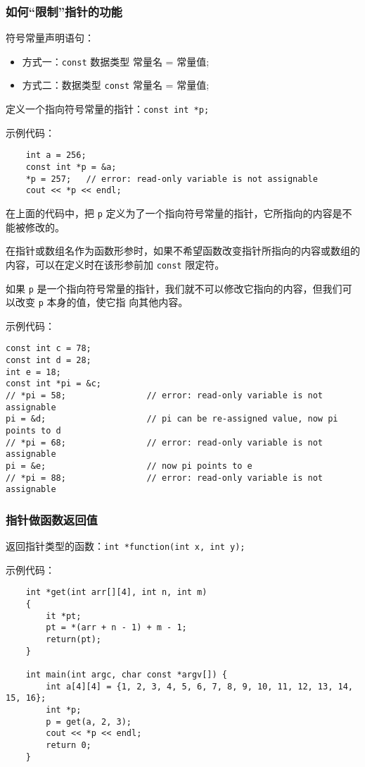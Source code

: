 \documentclass[UTF8]{ctexart}
\begin{document}
\subsubsection{如何“限制”指针的功能}
符号常量声明语句：
\begin{itemize}
    \item 方式一：\texttt{const} 数据类型 常量名 = 常量值;
    \item 方式二：数据类型 \texttt{const} 常量名 = 常量值;
\end{itemize}

定义一个指向符号常量的指针：\texttt{const int *p;}

示例代码：
\begin{verbatim}
    int a = 256;
    const int *p = &a;
    *p = 257;   // error: read-only variable is not assignable
    cout << *p << endl;
\end{verbatim}

在上面的代码中，把 \texttt{p} 定义为了一个指向符号常量的指针，它所指向的内容是不能被修改的。

在指针或数组名作为函数形参时，如果不希望函数改变指针所指向的内容或数组的内容，可以在定义时在该形参前加 \texttt{const}
限定符。

如果 \texttt{p} 是一个指向符号常量的指针，我们就不可以修改它指向的内容，但我们可以改变 \texttt{p} 本身的值，使它指
向其他内容。

示例代码：
\begin{verbatim}
const int c = 78;
const int d = 28;
int e = 18;
const int *pi = &c;
// *pi = 58;                // error: read-only variable is not assignable
pi = &d;                    // pi can be re-assigned value, now pi points to d
// *pi = 68;                // error: read-only variable is not assignable
pi = &e;                    // now pi points to e
// *pi = 88;                // error: read-only variable is not assignable
\end{verbatim}

\subsubsection{指针做函数返回值}
返回指针类型的函数：\texttt{int *function(int x, int y);}

示例代码：
\begin{verbatim}
    int *get(int arr[][4], int n, int m)
    {
        it *pt;
        pt = *(arr + n - 1) + m - 1;
        return(pt);
    }

    int main(int argc, char const *argv[]) {
        int a[4][4] = {1, 2, 3, 4, 5, 6, 7, 8, 9, 10, 11, 12, 13, 14, 15, 16};
        int *p;
        p = get(a, 2, 3);
        cout << *p << endl;
        return 0;
    }
\end{verbatim}
\end{document}
